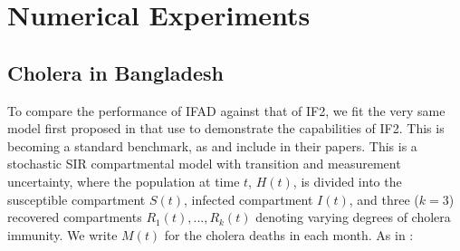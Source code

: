 \documentclass{article}
\begin{document}
\section{Numerical Experiments}

\subsection{Cholera in Bangladesh}

To compare the performance of IFAD against that of IF2, we fit the very same model first proposed in \cite{king08} that \cite{ionides15} use to demonstrate the capabilities of IF2. This is becoming a standard benchmark, as \cite{wood16} and \cite{wycoff2024voronoi} include in their papers. This is a stochastic SIR compartmental model with transition and measurement uncertainty, where the population at time $t$, $H(t)$, is divided into the susceptible compartment $S(t)$, infected compartment $I(t)$, and three ($k=3$) recovered compartments $R_1(t), ..., R_k(t)$ denoting varying degrees of cholera immunity. We write $M(t)$ for the cholera deaths in each month. As in \cite{ionides15}:
\end{document}
